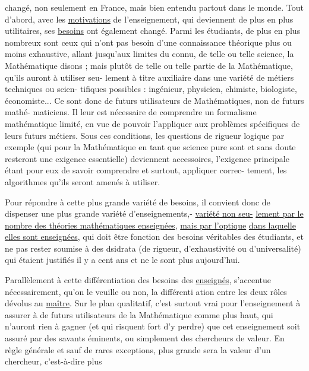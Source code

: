 
changé, non seulement en France, mais bien entendu partout dans le monde.
Tout d'abord, avec les \uline{motivations} de l'enseignement, qui deviennent de
plus en plus utilitaires, ses \uline{besoins} ont également changé. Parmi les
étudiants, de plus en plus nombreux sont ceux qui n'ont pas besoin d'une
connaissance théorique plus ou moins exhaustive, allant jusqu'aux limites
du connu, de telle ou telle science, la Mathématique disons ; mais plutôt
de telle ou telle partie de la Mathématique, qu'ils auront à utiliser seu-%
lement à titre auxiliaire dans une variété de métiers techniques ou scien-%
tifiques possibles : ingénieur, physicien, chimiste, biologiste, économiste...
Ce sont donc de futurs utilisateurs de Mathématiques, non de futurs mathé-%
maticiens. Il leur est nécessaire de comprendre un formalisme mathématique
limité, en vue de pouvoir l'appliquer aux problèmes spécifiques de leurs
futurs métiers. Sous ces conditions, les questions de rigueur logique par
exemple (qui pour la Mathématique en tant que science pure sont et sans
doute resteront une exigence essentielle) deviennent accessoires, l'exigence
principale étant pour eux de savoir comprendre et surtout, appliquer correc-%
tement, les algorithmes qu'ils seront amenés à utiliser.

Pour répondre à cette plus grande variété de besoins, il convient
donc de dispenser une plus grande variété d'enseignements,- \uline{variété non seu-}%
\uline{lement par le nombre des théories mathématiques enseignées}, \uline{mais par l'optique}
\uline{dans laquelle elles sont enseignées}, qui doit être fonction des besoins
véritables des étudiants, et ne pas rester soumise à des dsidrata (de
rigueur, d'exhaustivité ou d'universalité) qui étaient justifiés il y a
cent ans et ne le sont plus aujourd'hui.

Parallèlement à cette différentiation des besoins des \uline{enseignés},
s'accentue nécessairement, qu'on le veuille ou non, la différenti ation
entre les deux rôles dévolus au \uline{maître}. Sur le plan qualitatif, c'est
surtout vrai pour l'enseignement à assurer à de futurs utilisateurs de la
Mathématique comme plus haut, qui n'auront rien à gagner (et qui risquent
fort d'y perdre) que cet enseignement soit assuré par des savants éminents,
ou simplement des chercheurs de valeur. En règle générale et sauf de rares
exceptions, plus grande sera la valeur d'un chercheur, c'est-à-dire plus


